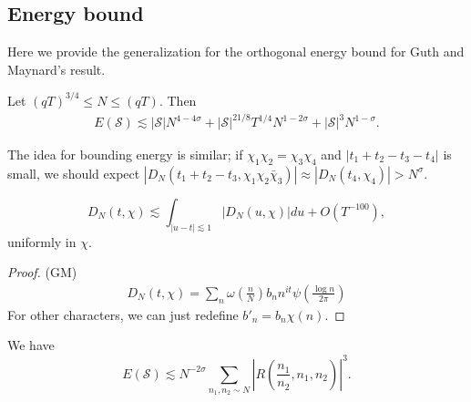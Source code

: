 
\subsection{Energy bound}
Here we provide the generalization for the orthogonal energy bound for Guth and Maynard's result. 
\begin{proposition}\label{energybound}
    Let $(qT)^{3/4}\leq N\leq (qT)$. Then
    \begin{align*}
E(\mathcal{S})\lesssim |\mathcal{S}|N^{4-4\sigma}+|\mathcal{S}|^{21/8}T^{1/4}N^{1-2\sigma}+|\mathcal{S}|^3N^{1-\sigma}.
    \end{align*}
\end{proposition}
The idea for bounding energy is similar; if $\chi_1\chi_2=\chi_3\chi_4$ and $|t_1+t_2-t_3-t_4|$ is small, we should expect $|D_N(t_1+t_2-t_3,\chi_1\chi_2\bar{\chi}_3)|\approx |D_N(t_4,\chi_4)|>N^\sigma$.
\begin{lemma}
    \label{Dirichletint}
    \[
    D_N(t,\chi)\lesssim \int_{|u-t|\lesssim 1} |D_N(u,\chi)|du + O(T^{-100}),
    \]
    uniformly in $\chi$.
\end{lemma}
\begin{proof}
    (GM)
    \begin{align*}
        D_N(t,\chi)=\sum_n \omega\left(\frac{n}{N}\right) b_n n^{it} \psi\left(\frac{\log n}{2\pi}\right)
    \end{align*}
    For other characters, we can just redefine $b'_n=b_n\chi(n)$.
\end{proof}
\begin{lemma} We have \[
    E(\mathcal{S})\lesssim N^{-2\sigma}\sum_{n_1,n_2\sim N}\left|R\left(\frac{n_1}{n_2},n_1,n_2\right) \right|^3.
    \]
    
\end{lemma}

